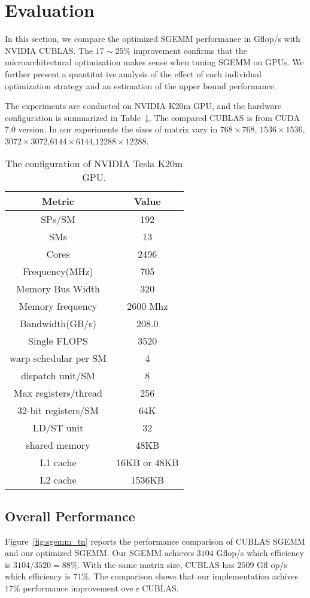 \section{Evaluation}
\label{sec:experiment}
In this section, we compare the optimized SGEMM performance in Gflop/s with NVIDIA CUBLAS. The $17\sim 25\%$ improvement
 confirms that the microarchitectural optimization makes sense when tuning SGEMM on GPUs. We further present a quantitat
ive analysis of the effect of each individual optimization strategy and an estimation of the upper bound performance.

The experiments are conducted on NVIDIA K20m GPU, and the hardware configuration is summarized in Table~\ref{table:k20}.
 The compared CUBLAS is from CUDA $7.0$ version. In our experiments the sizes of matrix vary in $768\times768$, 
 $1536\times1536$,$3072\times3072$,$6144\times6144$,$12288\times12288$.

\begin{table}[!t]
\caption{The configuration of NVIDIA Tesla K20m GPU.}
\centering
\scalebox{1.0} {
\begin{tabular}{|c|c|}
\hline
Metric& Value\\
\hline
SPs/SM &192\\
\hline
    SMs&13\\
\hline
Cores &2496\\
\hline
Frequency(MHz)&705\\
\hline
Memory Bus Width&320\\
\hline
Memory frequency&2600 Mhz\\
\hline
Bandwidth(GB/s)&208.0\\
\hline
Single FLOPS&3520\\
\hline
warp schedular per SM&4\\
\hline
dispatch unit/SM&8\\
\hline
Max registers/thread&256 \\
\hline
32-bit registers/SM&64K\\
\hline
LD/ST unit&32 \\
\hline
shared memory&48KB\\
\hline
L1 cache&16KB or 48KB\\
\hline
    L2 cache&1536KB\\
\hline
\end{tabular}
}
\label{table:k20}
\end{table}


\subsection{Overall Performance}
Figure~\ref{fig:sgemm_tn} reports the performance comparison of CUBLAS SGEMM and our optimized SGEMM.
Our SGEMM achieves $3104$ Gflop/s which efficiency is $3104/3520=88\%$. With the same matrix size, CUBLAS has $2509$ Gfl
op/s which efficiency is $71\%$. The comparison shows that our implementation achives $17\%$ performance improvement ove
r CUBLAS.

